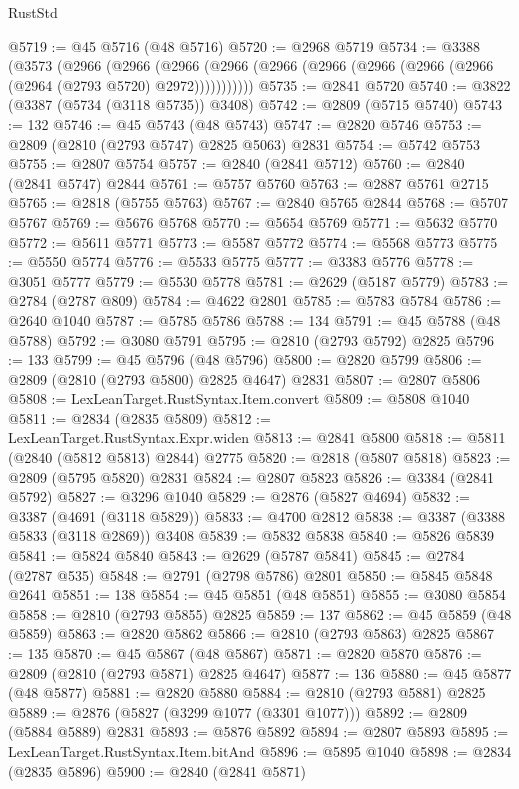 \begin{lexlean}{RustStd}
\begin{coremodule}
{\begin{coremodule}
{{{{{{{{{{{{{{{{{{{{{{{{{{{{{{{{{@5719 := @45 @5716 (@48 @5716)
@5720 := @2968 @5719
@5734 := @3388
    (@3573
      (@2966
        (@2966
          (@2966 (@2966 (@2966 (@2966 (@2966 (@2966 (@2966 (@2964 (@2793 @5720) @2972)))))))))))
@5735 := @2841 @5720
@5740 := @3822 (@3387 (@5734 (@3118 @5735)) @3408)
@5742 := @2809 (@5715 @5740)
@5743 := 132
@5746 := @45 @5743 (@48 @5743)
@5747 := @2820 @5746
@5753 := @2809 (@2810 (@2793 @5747) @2825 @5063) @2831
@5754 := @5742 @5753
@5755 := @2807 @5754
@5757 := @2840 (@2841 @5712)
@5760 := @2840 (@2841 @5747) @2844
@5761 := @5757 @5760
@5763 := @2887 @5761 @2715
@5765 := @2818 (@5755 @5763)
@5767 := @2840 @5765 @2844
@5768 := @5707 @5767
@5769 := @5676 @5768
@5770 := @5654 @5769
@5771 := @5632 @5770
@5772 := @5611 @5771
@5773 := @5587 @5772
@5774 := @5568 @5773
@5775 := @5550 @5774
@5776 := @5533 @5775
@5777 := @3383 @5776
@5778 := @3051 @5777
@5779 := @5530 @5778
@5781 := @2629 (@5187 @5779)
@5783 := @2784 (@2787 @809)
@5784 := @4622 @2801
@5785 := @5783 @5784
@5786 := @2640 @1040
@5787 := @5785 @5786
@5788 := 134
@5791 := @45 @5788 (@48 @5788)
@5792 := @3080 @5791
@5795 := @2810 (@2793 @5792) @2825
@5796 := 133
@5799 := @45 @5796 (@48 @5796)
@5800 := @2820 @5799
@5806 := @2809 (@2810 (@2793 @5800) @2825 @4647) @2831
@5807 := @2807 @5806
@5808 := LexLeanTarget.RustSyntax.Item.convert
@5809 := @5808 @1040
@5811 := @2834 (@2835 @5809)
@5812 := LexLeanTarget.RustSyntax.Expr.widen
@5813 := @2841 @5800
@5818 := @5811 (@2840 (@5812 @5813) @2844) @2775
@5820 := @2818 (@5807 @5818)
@5823 := @2809 (@5795 @5820) @2831
@5824 := @2807 @5823
@5826 := @3384 (@2841 @5792)
@5827 := @3296 @1040
@5829 := @2876 (@5827 @4694)
@5832 := @3387 (@4691 (@3118 @5829))
@5833 := @4700 @2812
@5838 := @3387 (@3388 @5833 (@3118 @2869)) @3408
@5839 := @5832 @5838
@5840 := @5826 @5839
@5841 := @5824 @5840
@5843 := @2629 (@5787 @5841)
@5845 := @2784 (@2787 @535)
@5848 := @2791 (@2798 @5786) @2801
@5850 := @5845 @5848 @2641
@5851 := 138
@5854 := @45 @5851 (@48 @5851)
@5855 := @3080 @5854
@5858 := @2810 (@2793 @5855) @2825
@5859 := 137
@5862 := @45 @5859 (@48 @5859)
@5863 := @2820 @5862
@5866 := @2810 (@2793 @5863) @2825
@5867 := 135
@5870 := @45 @5867 (@48 @5867)
@5871 := @2820 @5870
@5876 := @2809 (@2810 (@2793 @5871) @2825 @4647)
@5877 := 136
@5880 := @45 @5877 (@48 @5877)
@5881 := @2820 @5880
@5884 := @2810 (@2793 @5881) @2825
@5889 := @2876 (@5827 (@3299 @1077 (@3301 @1077)))
@5892 := @2809 (@5884 @5889) @2831
@5893 := @5876 @5892
@5894 := @2807 @5893
@5895 := LexLeanTarget.RustSyntax.Item.bitAnd
@5896 := @5895 @1040
@5898 := @2834 (@2835 @5896)
@5900 := @2840 (@2841 @5871)
}}}}}}}}}}}}}}}}}}}}}}}}}}}}}}}}}
\end{coremodule}}
\end{coremodule}
\end{lexlean}
